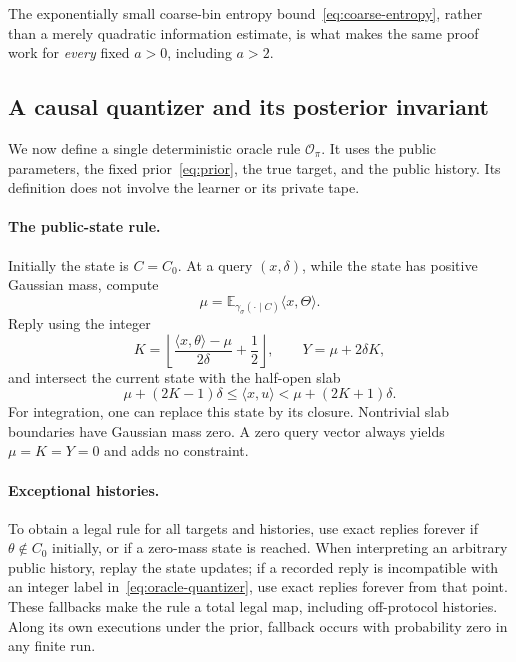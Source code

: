 \documentclass[11pt,a4paper]{article}
\newcommand{\E}{\mathbb E}
\newcommand{\ip}[2]{\langle #1,#2\rangle}
\theoremstyle{definition}
\theoremstyle{remark}
\begin{document}
The exponentially small coarse-bin entropy bound~\eqref{eq:coarse-entropy}, rather than a merely quadratic information estimate, is what makes the same proof work for \emph{every} fixed $a>0$, including $a>2$.

\subsection{A causal quantizer and its posterior invariant}\label{sec:oracle}
We now define a single deterministic oracle rule $\mathcal O_\pi$. It uses the public parameters, the fixed prior~\eqref{eq:prior}, the true target, and the public history. Its definition does not involve the learner or its private tape.

\paragraph{The public-state rule.} Initially the state is $C=C_0$. At a query $(x,\delta)$, while the state has positive Gaussian mass, compute
\begin{equation}\label{eq:mu}
 \mu=\E_{\gamma_\sigma(\cdot\mid C)}\ip{x}{\Theta}.
\end{equation}
Reply using the integer
\begin{equation}\label{eq:oracle-quantizer}
 K=\left\lfloor\frac{\ip{x}{\theta}-\mu}{2\delta}+\frac12\right\rfloor,
 \qquad Y=\mu+2\delta K,
\end{equation}
and intersect the current state with the half-open slab
\begin{equation}\label{eq:posterior-update}
 \mu+(2K-1)\delta\le\ip{x}{u}<\mu+(2K+1)\delta.
\end{equation}
For integration, one can replace this state by its closure. Nontrivial slab boundaries have Gaussian mass zero. A zero query vector always yields $\mu=K=Y=0$ and adds no constraint.

\paragraph{Exceptional histories.} To obtain a legal rule for all targets and histories, use exact replies forever if $\theta\notin C_0$ initially, or if a zero-mass state is reached. When interpreting an arbitrary public history, replay the state updates; if a recorded reply is incompatible with an integer label in~\eqref{eq:oracle-quantizer}, use exact replies forever from that point. These fallbacks make the rule a total legal map, including off-protocol histories. Along its own executions under the prior, fallback occurs with probability zero in any finite run.
\end{document}
